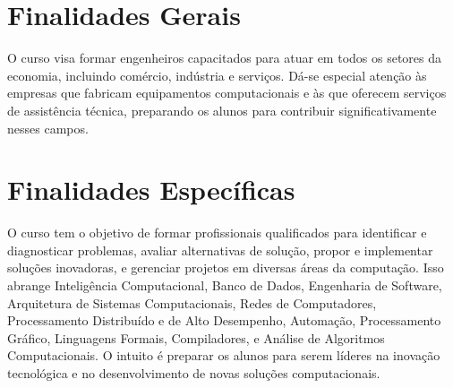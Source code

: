 \section{Finalidades Gerais}
O curso visa formar engenheiros capacitados para atuar em todos os setores da economia, incluindo comércio, indústria e serviços. Dá-se especial atenção às empresas que fabricam equipamentos computacionais e às que oferecem serviços de assistência técnica, preparando os alunos para contribuir significativamente nesses campos.

\section{Finalidades Específicas}
O curso tem o objetivo de formar profissionais qualificados para identificar e diagnosticar problemas, avaliar alternativas de solução, propor e implementar soluções inovadoras, e gerenciar projetos em diversas áreas da computação. Isso abrange Inteligência Computacional, Banco de Dados, Engenharia de Software, Arquitetura de Sistemas Computacionais, Redes de Computadores, Processamento Distribuído e de Alto Desempenho, Automação, Processamento Gráfico, Linguagens Formais, Compiladores, e Análise de Algoritmos Computacionais. O intuito é preparar os alunos para serem líderes na inovação tecnológica e no desenvolvimento de novas soluções computacionais.